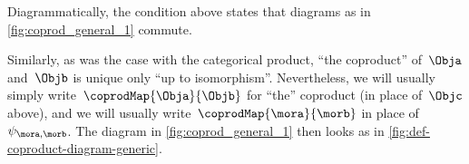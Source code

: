 \begin{remark}
    Diagrammatically, the condition above states that diagrams as in \cref{fig:coprod_general_1} commute.
    \begin{marginfigure}
        \centering
        \caption{}
        \label{fig:coprod_general_1}
        \label{fig:def-coproduct-diagram}
    \end{marginfigure}
    Similarly, as was the case with the categorical product, ``the coproduct'' of~$\Obja$ and~$\Objb$ is unique only ``up to isomorphism''.
    Nevertheless, we will usually simply write~$\coprodMap{\Obja}{\Objb}$ for ``the'' coproduct (in place of~$\Objc$ above), and we will usually write~$\coprodMap{\mora}{\morb}$ in place of~$\psi_{\mora, \morb}$.
    The diagram in \cref{fig:coprod_general_1} then looks as in \cref{fig:def-coproduct-diagram-generic}.
\end{remark}

\begin{marginfigure}
    \centering
    \caption{}
    \label{fig:def-coproduct-diagram-generic}
\end{marginfigure}
%
%

%



